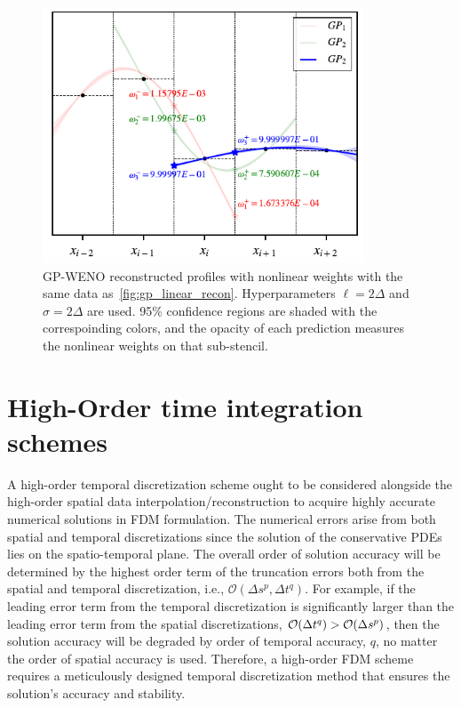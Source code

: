 \begin{figure}
    \centering
    \includegraphics[width=0.85\textwidth]{fig/gp_weno_nonlinW}
    \caption{GP-WENO reconstructed profiles with nonlinear weights with the same data as~\cref{fig:gp_linear_recon}.
        Hyperparameters \( \ell = 2\Delta \) and \( \sigma = 2\Delta \) are used. 95\% confidence regions
        are shaded with the correspoinding colors, and the opacity of each prediction measures the nonlinear weights
        on that sub-stencil.
    }\label{fig:gp_weno_nonlinW}
\end{figure}




\section{High-Order time integration schemes}\label{sec:time_integration}

A high-order temporal discretization scheme ought to be considered alongside
the high-order spatial data interpolation/reconstruction to acquire
highly accurate numerical solutions in FDM formulation.
The numerical errors arise from both spatial and temporal discretizations
since the solution of the conservative PDEs lies on the spatio-temporal plane.
The overall order of solution accuracy will be determined by the highest order term
of the truncation errors both from the spatial and temporal discretization, i.e.,
\( \mathcal{O}(\Delta s^{p}, \Delta t^{q}) \).
For example, if the leading error term from the temporal discretization
is significantly larger than the leading error term from the spatial discretizations,
\( \mathcal{O}(\Delta t^{q}) > \mathcal{O}(\Delta s^{p}) \),
then the solution accuracy will be degraded by order of temporal accuracy, \( q \),
no matter the order of spatial accuracy is used.
Therefore, a high-order FDM scheme requires a meticulously designed
temporal discretization method that ensures the solution’s accuracy and stability.

